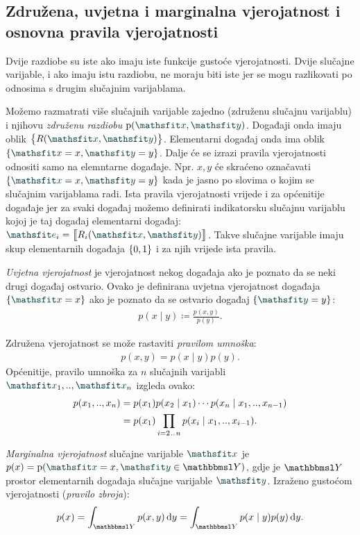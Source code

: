 \documentclass[utf8, diplomski, lmodern]{fer}
\begin{document}
\subsection{Združena, uvjetna i marginalna vjerojatnost i osnovna pravila vjerojatnosti}

Dvije razdiobe su iste ako imaju iste funkcije gustoće vjerojatnosti. Dvije slučajne varijable, i ako imaju istu razdiobu, ne moraju biti iste jer se mogu razlikovati po odnosima s drugim slučajnim varijablama.

Možemo razmatrati više slučajnih varijable zajedno (združenu slučajnu varijablu) i njihovu \emph{združenu razdiobu} $\p(\rvar x,\rvar y)$. Događaji onda imaju oblik $\cbr{R(\rvar x,\rvar y)}$. Elementarni događaj onda ima oblik $\cbr{\rvar x=x, \rvar y=y}$. Dalje će se izrazi pravila vjerojatnosti odnositi samo na elemntarne događaje. Npr. $x, y$ će skraćeno označavati $\cbr{\rvar x=x, \rvar y=y}$ kada je jasno po slovima o kojim se slučajnim varijablama radi. Ista pravila vjerojatnosti vrijede i za općenitije događaje jer za svaki događaj možemo definirati indikatorsku slučajnu varijablu kojoj je taj događaj elementarni događaj: $\rvar e_i = \enbbracket{R_i(\rvar x, \rvar y)}$. Takve slučajne varijable imaju skup elementarnih događaja $\cbr{0,1}$ i za njih vrijede ista pravila.

\emph{Uvjetna vjerojatnost} je vjerojatnost nekog događaja ako je poznato da se neki drugi događaj ostvario. Ovako je definirana uvjetna vjerojatnost događaja $\cbr{\rvar x=x}$ ako je poznato da se ostvario događaj $\cbr{\rvar y=y}$:
\begin{align} \label{eq:uvjetna-vj}
p(x\mid y) \coloneqq \frac{p(x,y)}{p(y)}  \text{.}
\end{align}

Združena vjerojatnost se može rastaviti \emph{pravilom umnoška}: 
\begin{align} \label{eq:pravilo-umnoska}
p(x,y) = p(x\mid y)p(y) \text{.}
\end{align}
Općenitije, pravilo umnoška za $n$ slučajnih varijabli $\rvar x_1,..,\rvar x_n$ izgleda ovako:
\begin{align} \label{eq:pravilo-umnoska}
p(x_1,..,x_n) 
&= p(x_1)p(x_2\mid x_1)\cdots p(x_n\mid x_1,..,x_{n-1})  \\
&= p(x_1)\prod_{i=2\mkern1.5mu{..}\mkern1.5mu n}p(x_i\mid x_1,..,x_{i-1})  \text{.}
\end{align}

\emph{Marginalna vjerojatnost} slučajne varijable $\rvar x$ je $p(x) = \p(\rvar x=x,\rvar y\in\set Y)$, gdje je $\set Y$ prostor elementarnih događaja slučajne varijable $\rvar y$. Izraženo gustoćom vjerojatnosti (\emph{pravilo zbroja}):
\begin{align}
p(x) = \int_{\set Y} p(x,y)\dif y = \int_{\set Y} p(x\mid y)p(y)\dif y \text{.}
\end{align}
\end{document}
